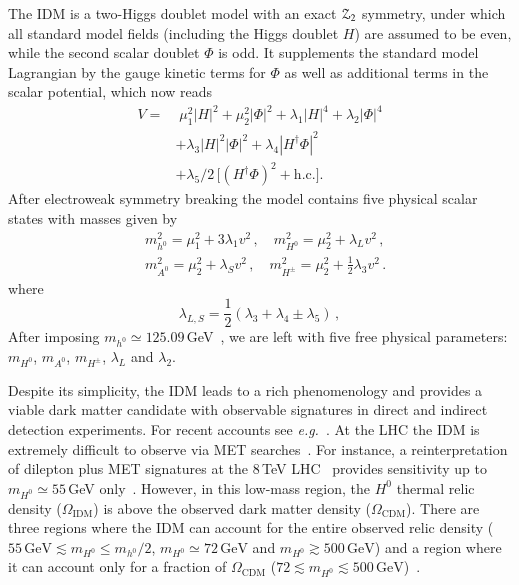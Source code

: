 \documentclass[preprint,number,sort&compress,twocolumn,3p]{elsstyarticle}
\newcommand{\hn}{h^0}
\newcommand{\Hn}{{H^0}}
\newcommand{\An}{A^0}
\newcommand{\Hp}{{H^\pm}}
\begin{document}
The IDM is a two-Higgs doublet model with an exact ${\cal{Z}}_2$ symmetry, 
under which all standard model fields (including the Higgs doublet $H$) 
are assumed to be even, while the second scalar doublet $\Phi$ is odd. 
It supplements the standard model Lagrangian by the gauge kinetic terms for $\Phi$ as well as
additional terms in the scalar potential, which now reads
\begin{equation}
\begin{split}
	V = &\;\mu_1^2 |H|^2  + \mu_2^2|\Phi|^2 + \lambda_1 |H|^4+ \lambda_2 |\Phi|^4 \\
	&+ \lambda_3 |H|^2| \Phi|^2
		+ \lambda_4 |H^\dagger\Phi|^2 \\
		&+ \lambda_5/2\,\big[ (H^\dagger\Phi)^2 + \mathrm{h.c.} \big].
\label{Eq:TreePotential}
\end{split}
\end{equation}
After electroweak symmetry breaking the model contains five physical scalar states with masses given by
\begin{equation}
\begin{split}
	&m_{\hn}^2 = \mu_1^2 + 3 \lambda_1 v^2\,,\quad
	m_{\Hn}^2= \mu_2^2 + \lambda_L v^2\,, \\ 
	&m_{\An}^2 = \mu_2^2 + \lambda_S v^2\,,\quad
	m_{\Hp}^2 = \mu_2^2 + \frac{1}{2} \lambda_3 v^2\,.
\end{split}
\end{equation}
where
\begin{equation}
	\lambda_{L,S} = \frac{1}{2} \left( \lambda_3 + \lambda_4 \pm \lambda_5 \right)\,,
\end{equation}
After imposing $m_{\hn} \simeq 125.09$\,GeV~\cite{pdg}, we are left with five free physical parameters: $m_{\Hn}$, $m_{\An}$, $m_{\Hp}$, $\lambda_L$ and $\lambda_2$.



Despite its simplicity, the IDM leads to a rich phenomenology and provides a viable dark matter candidate
with observable signatures in direct and indirect detection experiments. For recent accounts 
see \emph{e.g.}~\cite{Ilnicka:2015jba,Belyaev:2016lok,Eiteneuer:2017hoh}. 
At the LHC the IDM is extremely difficult to observe via MET searches~\cite{Pierce:2007ut,Cao:2007rm,Dolle:2009ft,Miao:2010rg,Gustafsson:2012aj,Belanger:2015kga}. For instance, a reinterpretation of dilepton plus MET signatures at the 8\,TeV LHC~\cite{Aad:2014vma}
provides sensitivity up to $m_{\Hn}\simeq 55\,$GeV only~\cite{Belanger:2015kga}. 
However, in this low-mass region, the $\Hn$ thermal relic density ($\Omega_{\text{IDM}}$) is above
the observed dark matter density ($\Omega_{\text{CDM}}$).
There are three regions where the IDM can account for the entire observed relic density ($55\,\text{GeV}\lesssim m_{\Hn} \le m_{h^0}/2$, $m_{\Hn}\simeq72\,\text{GeV}$ and $m_{\Hn}\gtrsim 500\,\text{GeV}$) and a region where it can account only for a fraction of $\Omega_{\text{CDM}}$  ($72 \lesssim m_{\Hn} \lesssim 500\,\text{GeV}$)~\cite{Goudelis:2013uca,Eiteneuer:2017hoh}.
\end{document}
